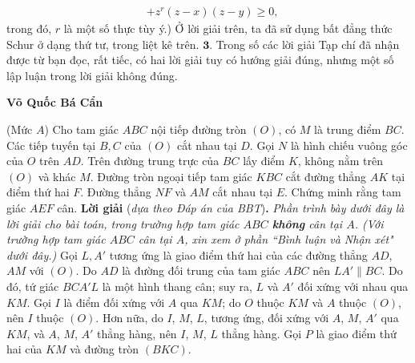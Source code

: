 \begin{multicols}{2}
{\begin{align*}
		&+ {z^r}\left( {z - x} \right)\left( {z - y} \right) \ge 0,
	\end{align*}
	trong đó, $r$ là một số thực tùy ý.})
	\vskip 0.05cm
	Ở lời giải trên, ta đã sử dụng bất đẳng thức Schur ở dạng thứ tư, trong liệt kê trên.
	\vskip 0.05cm
	$\pmb{3.}$ Trong số các lời giải Tạp chí đã nhận được từ bạn đọc, rất tiếc, có hai lời giải tuy có hướng giải đúng, nhưng một số lập luận trong lời giải không đúng.
	\begin{flushright}
		\textbf{\color{thachthuctoanhoc}Võ Quốc Bá Cẩn}
	\end{flushright}
{}
	(Mức $A$) Cho tam giác $ABC$ nội tiếp đường tròn $(O)$, có $M$ là trung điểm $BC$. Các tiếp tuyến tại $B,C$ của $(O)$ cắt nhau tại $D$. Gọi $N$ là hình chiếu vuông góc của $O$ trên $AD$. Trên đường trung trực của $BC$ lấy điểm $K$, không nằm trên $(O)$ và khác $M$. Đường tròn ngoại tiếp tam giác $KBC$ cắt đường thẳng $AK$ tại điểm thứ hai $F$. Đường thẳng $NF$ và $AM$ cắt nhau tại $E$. Chứng minh rằng tam giác $AEF$ cân.
	\vskip 0.05cm
	\textbf{\color{thachthuctoanhoc}Lời giải} (\textit{dựa theo Đáp án của BBT})\textbf{\color{thachthuctoanhoc}.}
	\vskip 0.05cm
	\textit{Phần trình bày dưới đây là lời giải cho bài toán, trong trường hợp tam giác $ABC$ \textbf{\color{thachthuctoanhoc}không} cân tại $A$.
	\vskip 0.05cm
	(Với trường hợp tam giác $ABC$ cân tại $A$, xin xem ở phần ``Bình luận và Nhận xét" dưới đây.)}
	\vskip 0.05cm
	Gọi $L,A'$ tương ứng là giao điểm thứ hai của các đường thẳng $AD$, $AM$ với $(O)$.
	\vskip 0.05cm
	Do $AD$ là đường đối trung của tam giác $ABC$ nên $LA' \parallel BC$.  Do đó, tứ giác $BCA'L$  là một hình thang cân; suy ra, $L$ và $A'$ đối xứng với nhau qua $KM$.
	\vskip 0.05cm
	Gọi $I$ là điểm đối xứng với $A$ qua $KM$; do $O$ thuộc $KM$ và $A$ thuộc $(O)$, nên $I$ thuộc $(O)$. Hơn nữa, do $I$, $M$, $L$, tương ứng, đối xứng với $A$, $M$, $A'$ qua $KM$, và $A$, $M$, $A'$  thẳng hàng, nên $I$, $M$, $L$ thẳng hàng.
	\vskip 0.05cm
	Gọi $P$ là giao điểm thứ hai của $KM$ và đường tròn $(BKC)$.
	\begin{figure}[H]
		\centering
		\captionsetup{labelformat= empty, justification=centering}

\end{figure}
\end{multicols}
